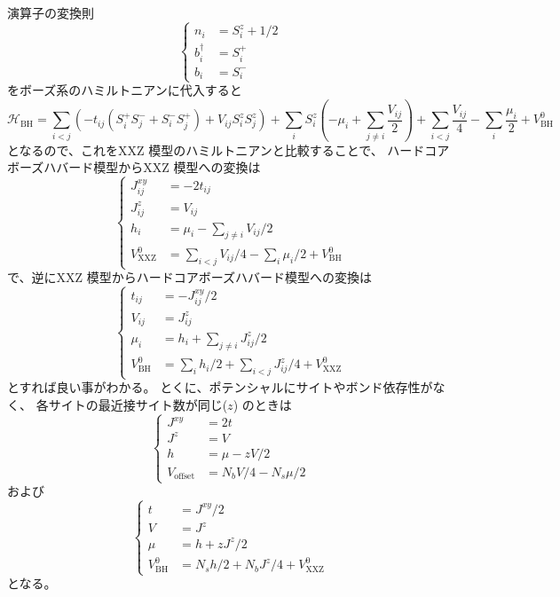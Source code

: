 \documentclass{jsarticle}
\begin{document}
演算子の変換則
\begin{equation}
  \begin{cases}
    n_i &= S_i^z + 1/2 \\
    b_i^\dagger &= S_i^+ \\
    b_i &= S_i^-
  \end{cases}
\end{equation}
をボーズ系のハミルトニアンに代入すると
\begin{equation}
  \mathcal{H}_\text{BH}
  =
  \sum_{i<j}\left( -t_{ij} \left(S_i^+ S_j^- + S_i^- S_j^+\right) + V_{ij} S_i^z S_j^z  \right)
  + \sum_i S_i^z \left( -\mu_i +  \sum_{j \ne i} \frac{V_{ij}}{2} \right)
  + \sum_{i<j} \frac{V_{ij}}{4}
  - \sum_i \frac{\mu_i}{2}
  + V_\text{BH}^0
\end{equation}
となるので、これをXXZ 模型のハミルトニアンと比較することで、
ハードコアボーズハバード模型からXXZ 模型への変換は
\begin{equation}
  \begin{cases}
    J_{ij}^{xy} &= -2t_{ij} \\
    J_{ij}^z &= V_{ij} \\
    h_i &= \mu_i - \sum_{j \ne i} V_{ij}/2 \\
    V_\text{XXZ}^0 &= \sum_{i<j}V_{ij}/4 - \sum_i \mu_i/2 + V_\text{BH}^0
  \end{cases}
\end{equation}
で、逆にXXZ 模型からハードコアボーズハバード模型への変換は
\begin{equation}
  \begin{cases}
    t_{ij} &= -J_{ij}^{xy}/2 \\
    V_{ij} &= J_{ij}^z \\
    \mu_i &= h_i + \sum_{j \ne i} J_{ij}^z/2 \\
    V_\text{BH}^0 &= \sum_i h_i/2 + \sum_{i<j} J_{ij}^z/4 + V_\text{XXZ}^0
  \end{cases}
\end{equation}
とすれば良い事がわかる。
とくに、ポテンシャルにサイトやボンド依存性がなく、
各サイトの最近接サイト数が同じ($z$) のときは
\begin{equation}
  \begin{cases}
    J^{xy} &= 2t \\
    J^z &= V \\
    h &= \mu - zV/2 \\
    V_\text{offset} &= N_bV/4 - N_s\mu/2
  \end{cases}
\end{equation}
および
\begin{equation}
  \begin{cases}
    t &= J^{xy}/2 \\
    V &= J^z \\
    \mu &= h + zJ^z/2 \\
    V_\text{BH}^0 &= N_sh/2 + N_bJ^z/4 + V_\text{XXZ}^0
  \end{cases}
\end{equation}
となる。
\end{document}
